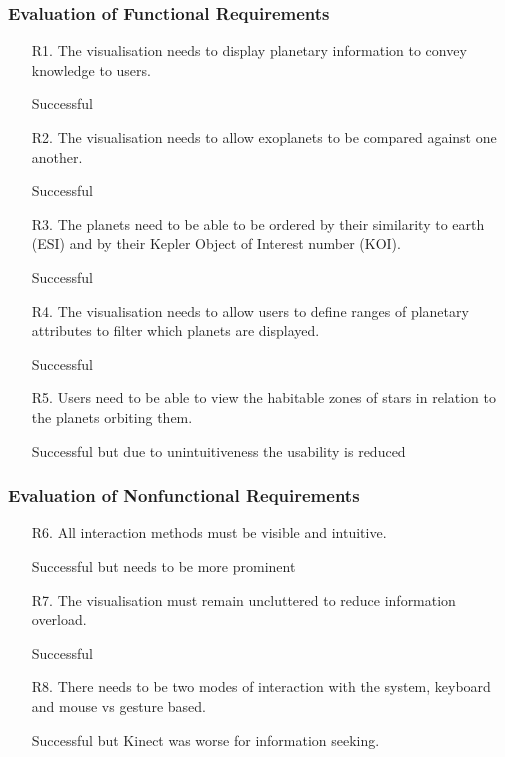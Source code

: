 \subsubsection{Evaluation of Functional Requirements}
\begin{enumerate}

 \item[R1.] The visualisation needs to display planetary information to convey
knowledge to users.

Successful

 \item[R2.] The visualisation needs to allow exoplanets to be compared against
one another.

Successful

 \item[R3.] The planets need to be able to be ordered by their similarity to
earth (ESI) and by their Kepler Object of Interest number (KOI).
 
Successful
 
 \item[R4.] The visualisation needs to allow users to define ranges of planetary
attributes to filter which planets are displayed.

Successful

 \item[R5.] Users need to be able to view the habitable zones of stars in
relation to the planets orbiting them.

Successful but due to unintuitiveness the usability is reduced

\end{enumerate}

\subsubsection{Evaluation of Nonfunctional Requirements}
\begin{enumerate}
 \item[R6.] All interaction methods must be visible and intuitive.

 Successful but needs to be more prominent
 
 \item[R7.] The visualisation must remain uncluttered to reduce information
overload.

Successful

 \item[R8.]  There needs to be two modes of interaction with the system,
keyboard and mouse vs gesture based.

Successful but Kinect was worse for information seeking.

\end{enumerate}

